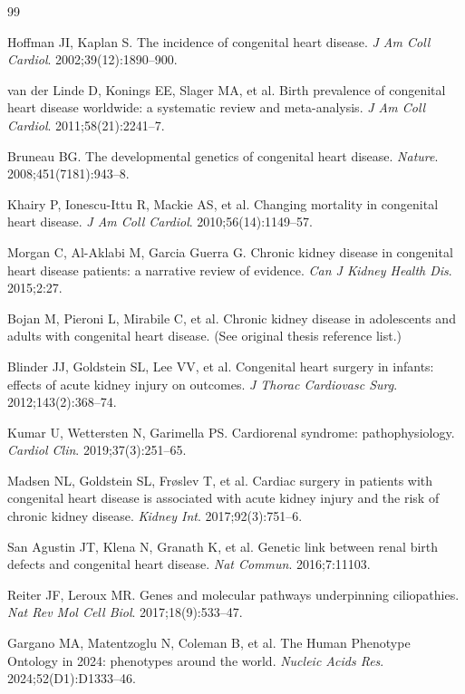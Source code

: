 \documentclass[11pt,a4paper]{article}
\begin{document}
\newpage
\begin{thebibliography}{99}
\small

 Hoffman JI, Kaplan S. The incidence of congenital heart disease.
\textit{J Am Coll Cardiol}. 2002;39(12):1890--900.

 van der Linde D, Konings EE, Slager MA, et al. Birth prevalence of
congenital heart disease worldwide: a systematic review and meta-analysis.
\textit{J Am Coll Cardiol}. 2011;58(21):2241--7.

 Bruneau BG. The developmental genetics of congenital heart disease.
\textit{Nature}. 2008;451(7181):943--8.

 Khairy P, Ionescu-Ittu R, Mackie AS, et al. Changing mortality in
congenital heart disease. \textit{J Am Coll Cardiol}. 2010;56(14):1149--57.

 Morgan C, Al-Aklabi M, Garcia Guerra G. Chronic kidney disease in
congenital heart disease patients: a narrative review of evidence.
\textit{Can J Kidney Health Dis}. 2015;2:27.

 Bojan M, Pieroni L, Mirabile C, et al. Chronic kidney disease in
adolescents and adults with congenital heart disease. (See original thesis reference list.)

 Blinder JJ, Goldstein SL, Lee VV, et al. Congenital heart surgery in
infants: effects of acute kidney injury on outcomes.
\textit{J Thorac Cardiovasc Surg}. 2012;143(2):368--74.

 Kumar U, Wettersten N, Garimella PS. Cardiorenal syndrome:
pathophysiology. \textit{Cardiol Clin}. 2019;37(3):251--65.

 Madsen NL, Goldstein SL, Frøslev T, et al. Cardiac surgery in patients
with congenital heart disease is associated with acute kidney injury and the risk of chronic
kidney disease. \textit{Kidney Int}. 2017;92(3):751--6.

 San Agustin JT, Klena N, Granath K, et al. Genetic link between
renal birth defects and congenital heart disease. \textit{Nat Commun}. 2016;7:11103.

 Reiter JF, Leroux MR. Genes and molecular pathways underpinning
ciliopathies. \textit{Nat Rev Mol Cell Biol}. 2017;18(9):533--47.

 Gargano MA, Matentzoglu N, Coleman B, et al. The Human Phenotype
Ontology in 2024: phenotypes around the world. \textit{Nucleic Acids Res}.
2024;52(D1):D1333--46.


\end{thebibliography}
\end{document}
